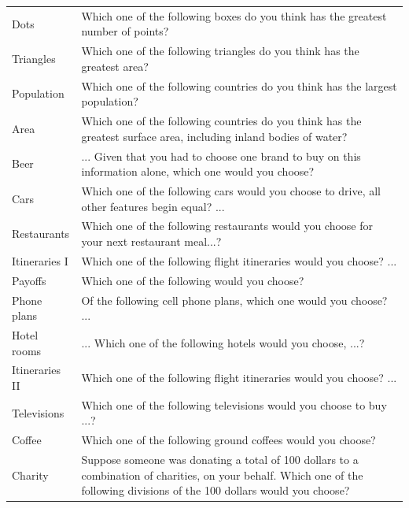 \documentclass[11pt,letter]{article}
\begin{document}
\begin{table}[h!]
\begin{center}
\begin{small}
\begin{tabular}{lp{12cm}}
		Dots & Which one of the following boxes do you think has the greatest number of points? \\
		Triangles & Which one of the following triangles do you think has the greatest area? \\
		Population & Which one of the following countries do you think has the largest population? \\
		Area & Which one of the following countries do you think has the greatest surface area, including inland bodies of water? \\
		Beer & ... Given that you had to choose one brand to buy on this information alone, which one would you choose? \\
		Cars & Which one of the following cars would you choose to drive, all other features
begin equal? ... \\
		Restaurants & Which one of the following restaurants would you choose for your next restaurant meal...? \\
		Itineraries I & Which one of the following flight itineraries would you choose? ... \\
		Payoffs & Which one of the following would you choose? \\
		Phone plans & Of the following cell phone plans, which one would you choose? ... \\
		Hotel rooms & ... Which one of the following hotels would you choose, ...? \\
		Itineraries II & Which one of the following flight itineraries would you choose? ... \\
		Televisions & Which one of the following televisions would you choose to buy ...? \\
		Coffee & Which one of the following ground coffees would you choose? \\
		Charity & Suppose someone was donating a total of 100 dollars to a combination of charities,
on your behalf.
Which one of the following divisions of the 100 dollars would you choose? \\
    \end{tabular}
    \end{small}
  \end{center}
\end{table}
\end{document}

